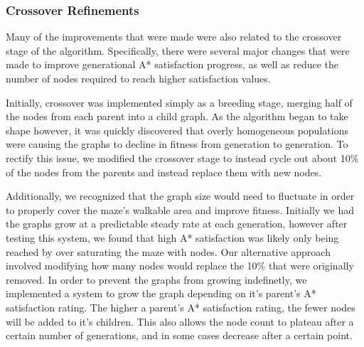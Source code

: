 	\subsubsection{Crossover Refinements}
	Many of the improvements that were made were also related to the crossover stage of the algorithm. Specifically, there were several major changes that were made to improve generational A* satisfaction progress, as well as reduce the number of nodes required to reach higher satisfaction values.
	
	Initially, crossover was implemented simply as a breeding stage, merging half of the nodes from each parent into a child graph. As the algorithm began to take shape however, it was quickly discovered that overly homogeneous populations were causing the graphs to decline in fitness from generation to generation. To rectify this issue, we modified the crossover stage to instead cycle out about 10\% of the nodes from the parents and instead replace them with new nodes.
	
	Additionally, we recognized that the graph size would need to fluctuate in order to properly cover the maze's walkable area and improve fitness. Initially we had the graphs grow at a predictable steady rate at each generation, however after testing this system, we found that high A* satisfaction was likely only being reached by over saturating the maze with nodes. Our alternative approach involved modifying how many nodes would replace the 10\% that were originally removed. In order to prevent the graphs from growing indefinetly, we implemented a system to grow the graph depending on it's parent's A* satisfaction rating. The higher a parent's A* satisfaction rating, the fewer nodes will be added to it's children. This also allows the node count to plateau after a certain number of generations, and in some cases decrease after a certain point.
	
	
	
	
	
	